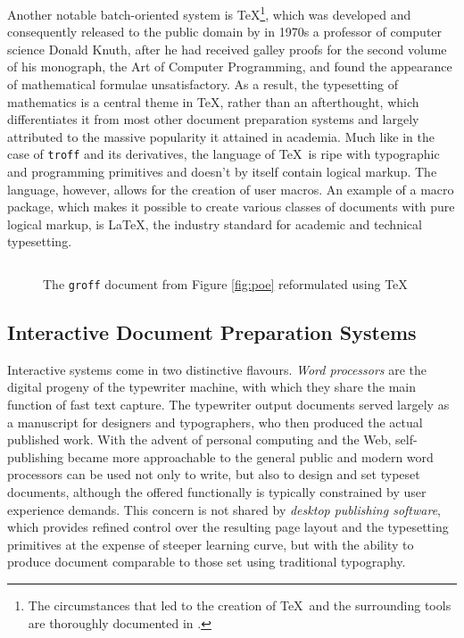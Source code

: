 \documentclass{book}
\begin{document}
        Another notable batch-oriented system is \TeX\footnote{
          The circumstances that led to the creation of \TeX\ and the
          surrounding tools are thoroughly documented in \cite{knuth98}.
        }, which was developed and consequently released to the public domain by
        in 1970s a professor of computer science Donald Knuth, after he had
        received galley proofs for the second volume of his monograph, the Art
        of Computer Programming, and found the appearance of mathematical
        formulae unsatisfactory. As a result, the typesetting of mathematics is
        a central theme in \TeX, rather than an afterthought, which
        differentiates it from most other document preparation systems and
        largely attributed to the massive popularity it attained in academia.
        Much like in the case of \texttt{troff} and its derivatives, the
        language of \TeX\ is ripe with typographic and programming primitives
        and doesn't by itself contain logical markup. The language, however,
        allows for the creation of user macros. An example of a macro package,
        which makes it possible to create various classes of documents with pure
        logical markup, is \LaTeX, the industry standard for academic and
        technical typesetting.
        
        \begin{figure}
          \inputminted{tex}{examples/02/poe.tex}
          \caption{The \texttt{groff} document from Figure \ref{fig:poe}
            reformulated using \TeX}
        \end{figure}

      \subsection{Interactive Document Preparation Systems}
        Interactive systems come in two distinctive flavours. \emph{Word
        processors} are the digital progeny of the typewriter machine, with
        which they share the main function of fast text capture. The typewriter
        output documents served largely as a manuscript for designers and
        typographers, who then produced the actual published work. With the
        advent of personal computing and the Web, self-publishing became more
        approachable to the general public and modern word processors can be
        used not only to write, but also to design and set typeset documents,
        although the offered functionally is typically constrained by user
        experience demands. This concern is not shared by \emph{desktop
        publishing software}, which provides refined control over the resulting page
        layout and the typesetting primitives at the expense of steeper learning
        curve, but with the ability to produce document comparable to those set
        using traditional typography.
\end{document}

